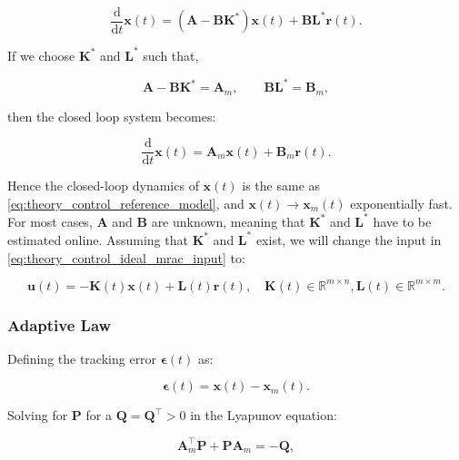 \begin{equation}
    \frac{\mathrm{d}}{\mathrm{d}t} \mathbf{x}(t) = (\mathbf{A} - \mathbf{B}\mathbf{K^*})\mathbf{x}(t) + \mathbf{B}\mathbf{L^*}\mathbf{r}(t).
\end{equation}

If we choose $\mathbf{K^*}$ and $\mathbf{L^*}$ such that,

\begin{equation}
    \mathbf{A} - \mathbf{B}\mathbf{K^*} = \mathbf{A}_m, \quad \quad \mathbf{B}\mathbf{L^*} = \mathbf{B}_m,
\end{equation}

then the closed loop system becomes:

\begin{equation}
    \frac{\mathrm{d}}{\mathrm{d}t} \mathbf{x}(t) = \mathbf{A}_m\mathbf{x}(t) + \mathbf{B}_m\mathbf{r}(t).
\end{equation}

Hence the closed-loop dynamics of $\mathbf{x}(t)$ is the same as \cref{eq:theory_control_reference_model}, and $\mathbf{x}(t) \to \mathbf{x}_m(t)$ exponentially fast. For most cases, $\mathbf{A}$ and $\mathbf{B}$ are unknown, meaning that $\mathbf{K^*}$ and $\mathbf{L^*}$ have to be estimated online. Assuming that $\mathbf{K^*}$ and $\mathbf{L^*}$ exist, we will change the input in \cref{eq:theory_control_ideal_mrac_input} to:

\begin{equation}
    \label{eq:theory_control_mrac_input}
    \mathbf{u}(t) = -\mathbf{K}(t)\mathbf{x}(t) + \mathbf{L}(t)\mathbf{r}(t),
    \quad \mathbf{K}(t) \in \mathbb{R}^{m \times n}, \mathbf{L}(t) \in \mathbb{R}^{m \times m}.
\end{equation}

\subsubsection*{Adaptive Law}

Defining the tracking error $\boldsymbol{\epsilon}(t)$ as:

\begin{equation}
    \boldsymbol{\epsilon}(t) = \mathbf{x}(t) - \mathbf{x}_m(t).
\end{equation}

Solving for $\mathbf{P}$ for a $\mathbf{Q} =\mathbf{Q}^\intercal > 0$ in the Lyapunov equation:

\begin{equation}
    \mathbf{A}_m^\intercal\mathbf{P} + \mathbf{P}\mathbf{A}_m = -\mathbf{Q},
\end{equation}

